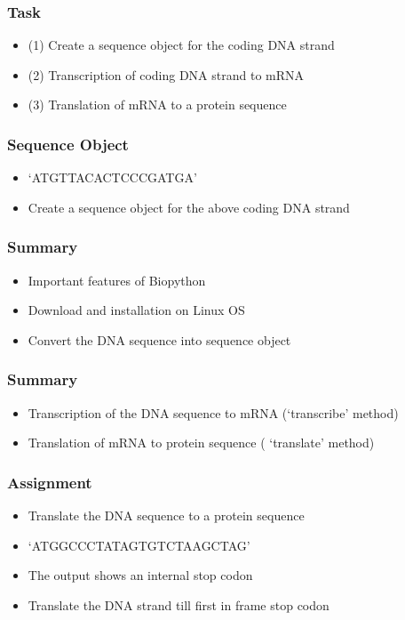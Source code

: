 \documentclass[17pt]{beamer}
\begin{document}
\begin{frame}
\frametitle{Task}
\begin{itemize} 
\item (1) Create a sequence object for the coding DNA strand
\item (2) Transcription of  coding DNA strand to mRNA
\item (3) Translation of mRNA to a protein sequence
\end{itemize}
\end{frame}

\begin{frame}
\frametitle{Sequence Object}
\begin{itemize} 
\item {\color {blue}`ATGTTACACTCCCGATGA'}
\item Create a sequence object for the above coding DNA strand
\end{itemize}
\end{frame}

\begin{frame}
\frametitle{Summary}
\begin{itemize} 
\item Important features of Biopython 
\item Download and installation on Linux OS
\item Convert the DNA sequence into sequence object
\end{itemize}
\end{frame}

\begin{frame}
\frametitle{Summary}
\begin{itemize} 
\item Transcription of the DNA sequence to mRNA ({\color {blue}`transcribe'} method) 
\item Translation of mRNA to protein sequence ({\color{blue} `translate'} method)
\end{itemize}
\end{frame}

\begin{frame}
\frametitle{Assignment}\pause
\begin{itemize}
\item Translate the DNA sequence to a protein sequence
\item {\small \color {blue} `ATGGCCCTATAGTGTCTAAGCTAG'}
\item The output shows an internal stop codon 
\item Translate the DNA strand till first in frame stop codon  
\end{itemize}
\end{frame}
\end{document}
